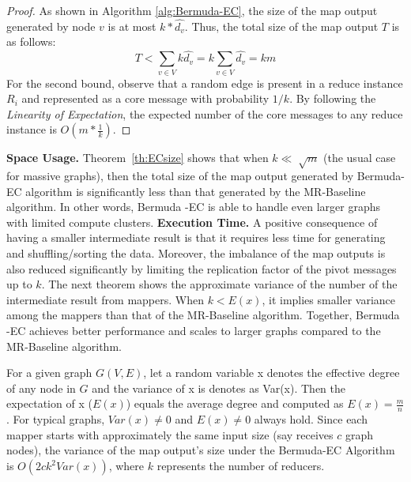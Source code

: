 \begin{proof}
	As shown in Algorithm \ref{alg:Bermuda-EC},  the size of the map output generated by node $v$ is at most $k*\hat{d_v}$.  Thus, the total size of the map output $T$ is as follows:
    \vj
    \[ T < \sum_{v \in V} k \hat{d_v} = k \sum_{v \in V} \hat{d_v}= km \]
    For the second bound, observe that a random edge is present in a reduce instance $R_i$ and represented as a core message with probability $1/k$.    
     By following the {\em Linearity of Expectation}, the expected number of the core messages to any reduce instance is $O(m*\frac{1}{k})$. 
\end{proof}

\textbf{Space Usage.} Theorem~\ref{th:ECsize} shows that when $k \ll \sqrt[]{m}$ (the usual case for massive graphs), 
then the total size of the map output generated by Bermuda-EC algorithm is significantly 
less than that  generated by the MR-Baseline algorithm. In other words, Bermuda -EC is able to handle even larger graphs with limited compute clusters. 
\textbf{Execution Time.} A positive consequence of having a smaller intermediate result is that it requires less time for generating and shuffling/sorting the data. 
Moreover, the  imbalance of the map outputs is also reduced significantly by limiting the replication factor of the pivot messages up to $k$.
The next theorem shows the approximate variance of the number of the intermediate result from mappers. 
When $k < E(x)$, it implies smaller variance among the mappers than that of the MR-Baseline algorithm. 
Together, Bermuda -EC achieves better performance and scales to larger graphs compared to the MR-Baseline algorithm. 

\begin{theorem}
\label{th:BEC}
	For a given graph $G(V,E)$, let a random variable x denotes the effective degree of any node in $G$ and the variance of x is denotes as Var(x). Then the expectation of x ($E(x)$) equals the average degree and computed as $E(x)=\frac{m}{n}$. For typical graphs, $Var(x) \neq 0$ and $E(x) \neq 0$ always hold. Since each mapper starts with approximately the same input size (say receives $c$ graph nodes), the variance of the map output's size under the Bermuda-EC Algorithm is  $O(2ck^2Var(x))$, 
	where $k$ represents the number of reducers. 
\end{theorem}

